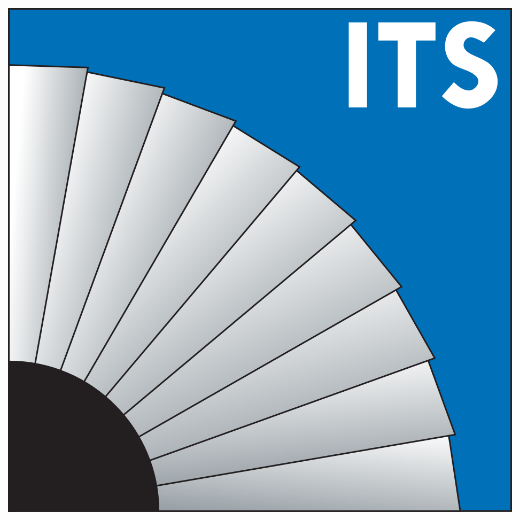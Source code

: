 \begin{titlepage}
\pagestyle{empty}												
\hspace*{-1cm}													%
\parbox[t][21cm][t]{4cm}										%
	{															%
	\begin{center}
		\vspace*{-2cm}\hspace*{-2cm}
		\includegraphics[scale=1.0]{sonstiges/its_logo.png}		%
		

\end{center}}
\end{titlepage}
